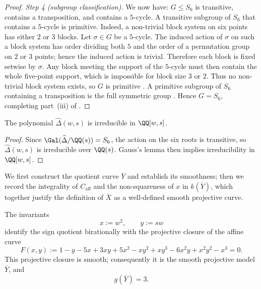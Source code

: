 \begin{proof}
\medskip
\noindent\textit{Step 4 (subgroup classification).}\quad
We now have: \(G\le S_6\) is transitive, contains a transposition, and
contains a \(5\)-cycle. A transitive subgroup of \(S_6\) that contains
a \(5\)-cycle is primitive. Indeed, a non-trivial block system on six
points has either \(2\) or \(3\) blocks. Let \(\sigma\in G\) be a
\(5\)-cycle. The induced action of \(\sigma\) on such a block system
has order dividing both \(5\) and the order of a permutation group on
\(2\) or \(3\) points; hence the induced action is trivial. Therefore
each block is fixed setwise by \(\sigma\). Any block meeting the support
of the \(5\)-cycle must then contain the whole five-point support,
which is impossible for block size \(3\) or \(2\). Thus no non-trivial
block system exists, so \(G\) is primitive
\cite[Ch.~3, \S{}3.3]{Dixon1996}.
A primitive subgroup of \(S_6\) containing a transposition is the full
symmetric group \cite[Ch.~3, Theorem~3.3A]{Dixon1996}. Hence \(G=S_6\),
completing part~\textup{(iii)} of .

\end{proof}

\begin{corollary}\label{lem:hatdelta-irreducible}
The polynomial \(\widehat\Delta(w,s)\) is irreducible in \(\QQ[w,s]\).
\end{corollary}

\begin{proof}
Since \(\Gal(\widehat\Delta/\QQ(s))=S_6\), the action on the six roots is
transitive, so \(\widehat\Delta(w,s)\) is irreducible over \(\QQ(s)\).
Gauss's lemma then implies irreducibility in \(\QQ[w,s]\).
\end{proof}
We first construct the quotient curve \(\overline{Y}\) and establish its
smoothness; then we record the integrality of \(C_{\mathrm{aff}}\) and
the non-squareness of \(x\) in \(k(\overline{Y})\), which together
justify the definition of \(\overline{X}\) as a well-defined smooth
projective curve.

\begin{proposition}
  \label{prop:sync-hatdelta-quotient}
  The invariants
  \[
    x:=w^2,\qquad y:=sw
  \]
  identify the sign quotient birationally with the projective closure of
  the affine curve
  \[
    F(x,y):=
    1-y-5x+3xy+5x^2-xy^2+xy^3-6x^2y+x^2y^2-x^3=0.
  \]
  This projective closure is smooth; consequently it is the smooth
  projective model \(\overline{Y}\), and
  \[
    g(\overline{Y})=3.
  \]
\end{proposition}

